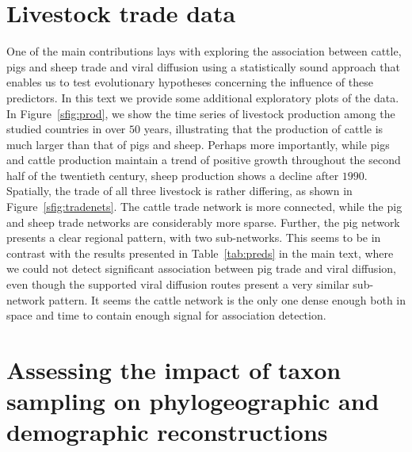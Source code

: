 \documentclass[a4paper,10pt]{article}
\begin{document}
\section*{Livestock trade data}

One of the main contributions lays with exploring the association between cattle, pigs and sheep trade and viral diffusion using a statistically sound approach that enables us to test evolutionary hypotheses concerning the influence of these predictors.
In this text we provide some additional exploratory plots of the data.
In Figure~\ref{sfig:prod}, we show the time series of livestock production among the studied countries in over $50$ years, illustrating that the production of cattle is much larger than that of pigs and sheep.
Perhaps more importantly, while pigs and cattle production maintain a trend of positive growth throughout the second half of the twentieth century, sheep production shows a decline after $1990$.
Spatially, the trade of all three livestock is rather differing, as shown in Figure~\ref{sfig:tradenets}.
The cattle trade network is more connected, while the pig and sheep trade networks are considerably more sparse.
Further, the pig network presents a clear regional pattern, with two sub-networks.
This seems to be in contrast with the results presented in Table~\ref{tab:preds} in the main text, where we could not detect significant association between pig trade and viral diffusion, even though the supported viral diffusion routes present a very similar sub-network pattern.
It seems the cattle network is the only one dense enough both in space and time to contain enough signal for association detection.

\section*{Assessing the impact of taxon sampling on phylogeographic and demographic reconstructions}
\end{document}

